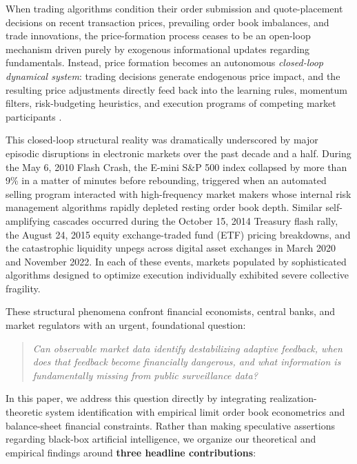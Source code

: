 \documentclass[12pt]{article}
\theoremstyle{definition}
\theoremstyle{remark}
\begin{document}
When trading algorithms condition their order submission and quote-placement decisions on recent transaction prices, prevailing order book imbalances, and trade innovations, the price-formation process ceases to be an open-loop mechanism driven purely by exogenous informational updates regarding fundamentals. Instead, price formation becomes an autonomous \emph{closed-loop dynamical system}: trading decisions generate endogenous price impact, and the resulting price adjustments directly feed back into the learning rules, momentum filters, risk-budgeting heuristics, and execution programs of competing market participants \citep{bouchaud2004fluctuations,cont2010stochastic,cont2014}. 

This closed-loop structural reality was dramatically underscored by major episodic disruptions in electronic markets over the past decade and a half. During the May 6, 2010 Flash Crash, the E-mini S\&P 500 index collapsed by more than 9\% in a matter of minutes before rebounding, triggered when an automated selling program interacted with high-frequency market makers whose internal risk management algorithms rapidly depleted resting order book depth. Similar self-amplifying cascades occurred during the October 15, 2014 Treasury flash rally, the August 24, 2015 equity exchange-traded fund (ETF) pricing breakdowns, and the catastrophic liquidity unpegs across digital asset exchanges in March 2020 and November 2022. In each of these events, markets populated by sophisticated algorithms designed to optimize execution individually exhibited severe collective fragility.

These structural phenomena confront financial economists, central banks, and market regulators with an urgent, foundational question:
\begin{quote}
\centering
\emph{Can observable market data identify destabilizing adaptive feedback, when does that feedback become financially dangerous, and what information is fundamentally missing from public surveillance data?}
\end{quote}

In this paper, we address this question directly by integrating realization-theoretic system identification with empirical limit order book econometrics and balance-sheet financial constraints. Rather than making speculative assertions regarding black-box artificial intelligence, we organize our theoretical and empirical findings around \textbf{three headline contributions}:
\end{document}

